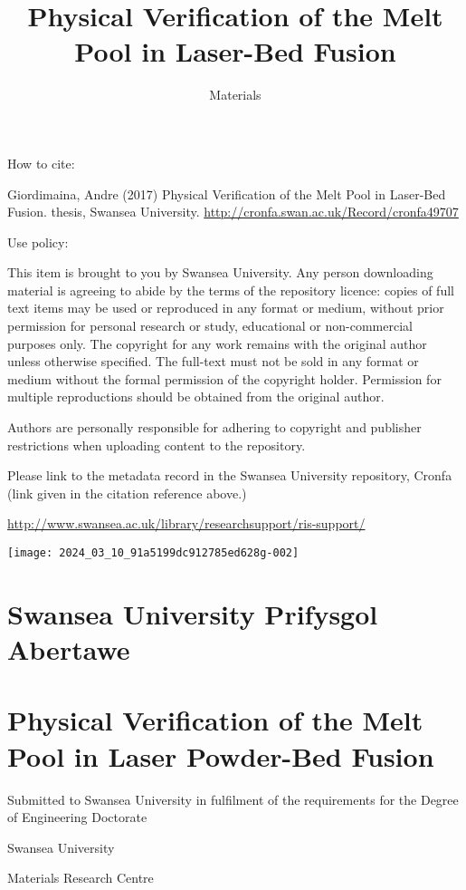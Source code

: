 \documentclass[10pt]{article}
\title{Physical Verification of the Melt Pool in Laser-Bed Fusion }
\author{Materials}
\date{}
\begin{document}
\maketitle
How to cite:

Giordimaina, Andre (2017) Physical Verification of the Melt Pool in Laser-Bed Fusion. thesis, Swansea University. \href{http://cronfa.swan.ac.uk/Record/cronfa49707}{http://cronfa.swan.ac.uk/Record/cronfa49707}

Use policy:

This item is brought to you by Swansea University. Any person downloading material is agreeing to abide by the terms of the repository licence: copies of full text items may be used or reproduced in any format or medium, without prior permission for personal research or study, educational or non-commercial purposes only. The copyright for any work remains with the original author unless otherwise specified. The full-text must not be sold in any format or medium without the formal permission of the copyright holder. Permission for multiple reproductions should be obtained from the original author.

Authors are personally responsible for adhering to copyright and publisher restrictions when uploading content to the repository.

Please link to the metadata record in the Swansea University repository, Cronfa (link given in the citation reference above.)

\href{http://www.swansea.ac.uk/library/researchsupport/ris-support/}{http://www.swansea.ac.uk/library/researchsupport/ris-support/}

\begin{center}
\texttt{[image: 2024\_03\_10\_91a5199dc912785ed628g-002]}
\end{center}

\section*{Swansea University Prifysgol Abertawe }
\section*{Physical Verification of the Melt Pool in Laser Powder-Bed Fusion}
Submitted to Swansea University in fulfilment of the requirements for the Degree of Engineering Doctorate

Swansea University

Materials Research Centre
\end{document}
